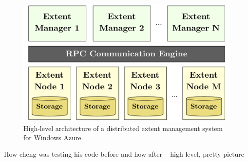 \begin{figure}[t]
\centering
\includegraphics[width=\linewidth]{img/azurestore}
\caption{High-level architecture of a distributed extent management system for Windows Azure.}
\label{fig:azurestore}
\end{figure}

How cheng was testing his code before and how after -- high level, pretty picture

